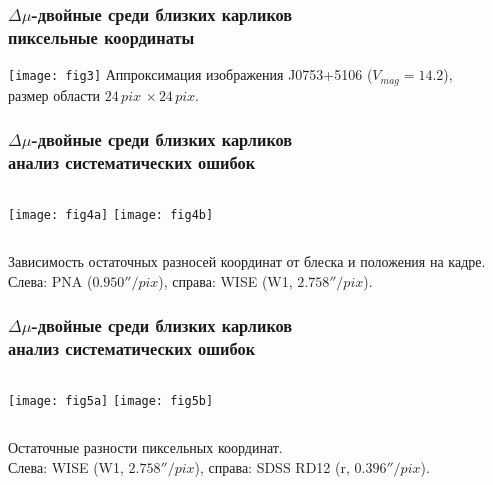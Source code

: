 
\begin{frame}
\frametitle{$\Delta\mu$-двойные среди близких карликов\\{\small пиксельные координаты}}
\begin{center}
\texttt{[image: fig3]}
{\footnotesize Аппроксимация изображения J0753+5106 ($V_{mag}=14.2$),\\ размер области $24\,pix\,\times 24\,pix$.}
\end{center}
\end{frame}


\begin{frame}%
\frametitle{$\Delta\mu$-двойные среди близких карликов\\{\small анализ систематических ошибок}}
\begin{center}
\begin{columns}
	\texttt{[image: fig4a]}
	\texttt{[image: fig4b]}
\end{columns}
\end{center}
{\footnotesize Зависимость остаточных разносей координат от блеска и положения на кадре. Слева: PNA ($0.950''/pix$), справа: WISE (W1, $2.758''/pix$). }
\end{frame}

\begin{frame}%
\frametitle{$\Delta\mu$-двойные среди близких карликов\\{\small анализ систематических ошибок}}
\begin{center}
\begin{columns}
	\texttt{[image: fig5a]}
	\texttt{[image: fig5b]}
\end{columns}
\end{center}
{\footnotesize Остаточные разности пиксельных координат.\\ Слева: WISE (W1, $2.758''/pix$), справа: SDSS RD12 (r, $0.396''/pix$). }
\end{frame}


